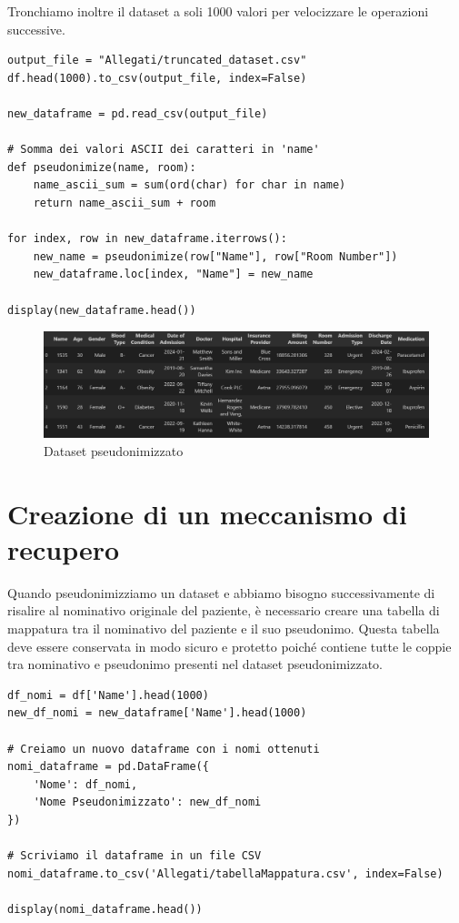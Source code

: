 Tronchiamo inoltre il dataset a soli 1000 valori per velocizzare le operazioni successive. \\


\begin{lstlisting}[caption={Visualizzazione dataset}]
output_file = "Allegati/truncated_dataset.csv"
df.head(1000).to_csv(output_file, index=False) 

new_dataframe = pd.read_csv(output_file)

# Somma dei valori ASCII dei caratteri in 'name'
def pseudonimize(name, room):
    name_ascii_sum = sum(ord(char) for char in name) 
    return name_ascii_sum + room
    
for index, row in new_dataframe.iterrows():
    new_name = pseudonimize(row["Name"], row["Room Number"])
    new_dataframe.loc[index, "Name"] = new_name

display(new_dataframe.head())
\end{lstlisting}

\begin{figure}[H]
    \centering
    \includegraphics[width=0.95\linewidth]{Images/Img2.png}
    \caption{Dataset pseudonimizzato}
\end{figure}

\section{Creazione di un meccanismo di recupero}

Quando pseudonimizziamo un dataset e abbiamo bisogno successivamente di risalire al nominativo originale del paziente, è necessario creare una tabella di mappatura tra il nominativo del paziente e il suo pseudonimo. Questa tabella deve essere conservata in modo sicuro e protetto poiché contiene tutte le coppie tra nominativo e pseudonimo presenti nel dataset pseudonimizzato.\\

\begin{lstlisting}[caption={Creazione Tabella di Mappatura}]
df_nomi = df['Name'].head(1000)
new_df_nomi = new_dataframe['Name'].head(1000)

# Creiamo un nuovo dataframe con i nomi ottenuti
nomi_dataframe = pd.DataFrame({
    'Nome': df_nomi,
    'Nome Pseudonimizzato': new_df_nomi
})

# Scriviamo il dataframe in un file CSV
nomi_dataframe.to_csv('Allegati/tabellaMappatura.csv', index=False)

display(nomi_dataframe.head())
\end{lstlisting}

